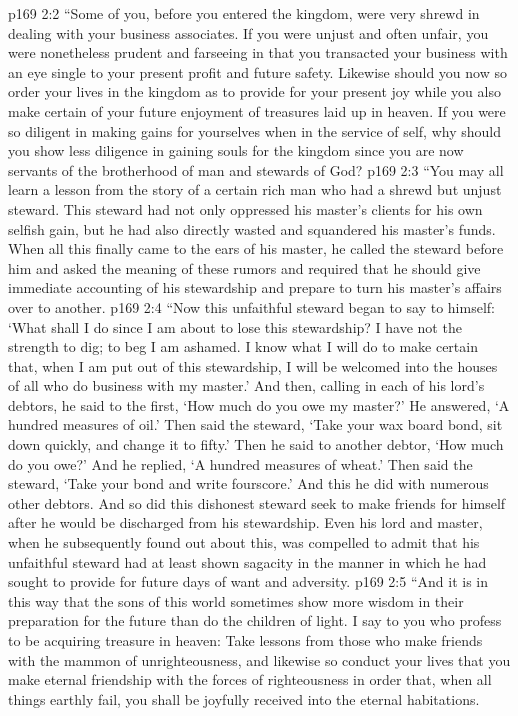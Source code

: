 \pc \vs p169 2:2 \textcolor{ubdarkred}{“Some of you, before you entered the kingdom, were very shrewd in dealing with your business associates. If you were unjust and often unfair, you were nonetheless prudent and farseeing in that you transacted your business with an eye single to your present profit and future safety. Likewise should you now so order your lives in the kingdom as to provide for your present joy while you also make certain of your future enjoyment of treasures laid up in heaven. If you were so diligent in making gains for yourselves when in the service of self, why should you show less diligence in gaining souls for the kingdom since you are now servants of the brotherhood of man and stewards of God?}
\vs p169 2:3 \textcolor{ubdarkred}{“You may all learn a lesson from the story of a certain rich man who had a shrewd but unjust steward. This steward had not only oppressed his master’s clients for his own selfish gain, but he had also directly wasted and squandered his master’s funds. When all this finally came to the ears of his master, he called the steward before him and asked the meaning of these rumors and required that he should give immediate accounting of his stewardship and prepare to turn his master’s affairs over to another.}
\vs p169 2:4 \textcolor{ubdarkred}{“Now this unfaithful steward began to say to himself: ‘What shall I do since I am about to lose this stewardship? I have not the strength to dig; to beg I am ashamed. I know what I will do to make certain that, when I am put out of this stewardship, I will be welcomed into the houses of all who do business with my master.’ And then, calling in each of his lord’s debtors, he said to the first, ‘How much do you owe my master?’ He answered, ‘A hundred measures of oil.’ Then said the steward, ‘Take your wax board bond, sit down quickly, and change it to fifty.’ Then he said to another debtor, ‘How much do you owe?’ And he replied, ‘A hundred measures of wheat.’ Then said the steward, ‘Take your bond and write fourscore.’ And this he did with numerous other debtors. And so did this dishonest steward seek to make friends for himself after he would be discharged from his stewardship. Even his lord and master, when he subsequently found out about this, was compelled to admit that his unfaithful steward had at least shown sagacity in the manner in which he had sought to provide for future days of want and adversity.}
\vs p169 2:5 \textcolor{ubdarkred}{“And it is in this way that the sons of this world sometimes show more wisdom in their preparation for the future than do the children of light. I say to you who profess to be acquiring treasure in heaven: Take lessons from those who make friends with the mammon of unrighteousness, and likewise so conduct your lives that you make eternal friendship with the forces of righteousness in order that, when all things earthly fail, you shall be joyfully received into the eternal habitations.}
